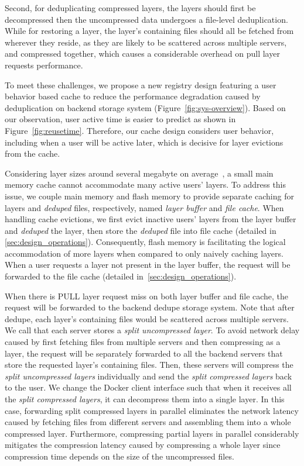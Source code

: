 Second, for deduplicating compressed layers, 
the layers should first be decompressed then the uncompressed data undergoes a file-level deduplication. 
While for restoring a layer, the layer's
containing files should all be fetched from wherever they reside, as they are likely to be scattered across multiple servers, 
and compressed together, which causes a considerable overhead on pull layer requests performance.

To meet these challenges, we propose a new registry design featuring a user behavior based cache to reduce the performance degradation caused by deduplication on backend storage system (Figure~\ref{fig:sys-overview}).
Based on our observation, user active time is easier to predict as shown in Figure~\ref{fig:reusetime}.
Therefore, our cache design considers user behavior, including when a user will be active later, which is decisive for layer evictions from the cache.

Considering layer sizes around several megabyte on average~\cite{dockerworkload}, 
a small main memory cache cannot accommodate many active users' layers.
To address this issue, we couple main memory and flash memory to provide separate caching for layers and \emph{deduped} files, respectively, named \emph{layer buffer} and \emph{file cache}.
When handling cache evictions, we first evict inactive users' layers from the layer buffer and \emph{deduped} the layer, then store the \emph{deduped} file into file cache (detailed in \cref{sec:design_operations}). 
Consequently, flash memory is facilitating the logical accommodation of more layers when compared to only naively caching layers.
When a user requests a layer not present in the layer buffer, the request will be forwarded to the file cache (detailed in~\cref{sec:design_operations}). 

When there is PULL layer request miss on both layer buffer and file cache, the request will be forwarded to the backend dedupe storage system.
Note that after dedupe, each layer's containing files would be scattered across multiple servers. 
We call that each server stores a \emph{split uncompressed layer}.
To avoid network delay caused by first fetching files from multiple servers and then compressing as a layer,
the request will be separately forwarded to all the backend servers that store the requested layer's containing files. 
Then, these servers will compress the \emph{split uncompressed layers} individually and send the \emph{split compressed layers} back to the user.
We change the Docker client interface such that when it receives all the \emph{split compressed layers}, it can decompress them into a single layer.
In this case,  
forwarding split compressed layers in parallel eliminates the network latency caused by fetching files from different servers and assembling them into a whole compressed layer.
Furthermore, compressing partial layers in parallel considerably mitigates the compression latency caused by compressing a whole layer since compression time depends on the size of the uncompressed files.

